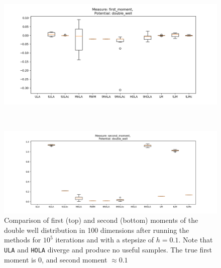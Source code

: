 \begin{figure}
\centering
  \begin{minipage}[b]{0.85\textwidth}
  \centering
    \includegraphics[width=\textwidth]{Figures/doublewell_0_1_10_5samp_100dFirstMoment.png}
  \end{minipage}\\ %
  \begin{minipage}[b]{0.85\textwidth}
  \centering
    \includegraphics[width=\textwidth]{Figures/secondmoment_double_well_100d_10_5samp.png}
  \end{minipage} %
  \caption{Comparison of first (top) and second (bottom) moments of the double well distribution in 100 dimensions after running the methods for \(10^5\) iterations and with a stepsize of \(h=0.1\). Note that \texttt{ULA} and \texttt{HOLA} diverge and produce no useful samples.  The true first moment is 0, and second moment $\approx 0.1$}
  \label{fig:doubleWell_moment}
  \end{figure}
  

